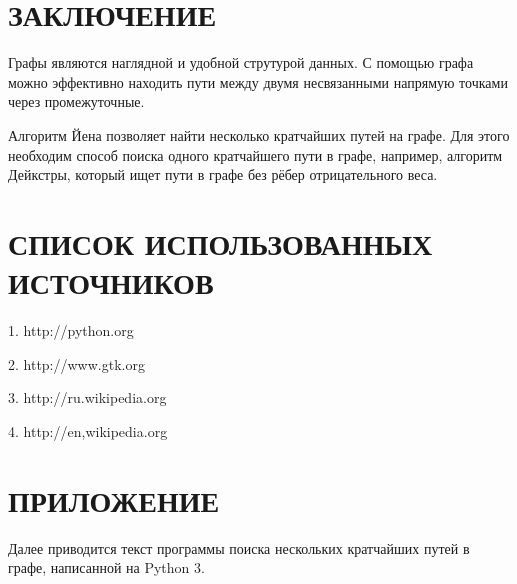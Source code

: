 \section*{ЗАКЛЮЧЕНИЕ}
Графы являются наглядной и удобной струтурой данных. С помощью графа можно эффективно находить пути между двумя несвязанными напрямую точками через промежуточные.

Алгоритм Йена позволяет найти несколько кратчайших путей на графе. Для этого необходим способ поиска одного кратчайшего пути в графе, например, алгоритм Дейкстры, который ищет пути в графе без рёбер отрицательного веса.
\section*{СПИСОК ИСПОЛЬЗОВАННЫХ ИСТОЧНИКОВ}
1. http://python.org

2. http://www.gtk.org

3. http://ru.wikipedia.org

4. http://en,wikipedia.org
\section*{ПРИЛОЖЕНИЕ}
Далее приводится текст программы поиска нескольких кратчайших путей в графе, написанной на Python 3.

